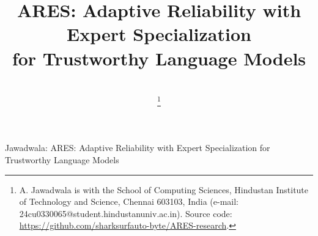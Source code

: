 \documentclass[journal,10pt,twocolumn]{IEEEtran}
\begin{document}
\title{ARES: Adaptive Reliability with Expert Specialization\\for Trustworthy Language Models}

\author{
     \\
    \thanks{A. Jawadwala is with the School of Computing Sciences, Hindustan Institute of Technology and Science, Chennai 603103, India (e-mail: 24cu0330065@student.hindustanuniv.ac.in). Source code: \url{https://github.com/sharksurfauto-byte/ARES-research}.}
}

%
{Jawadwala: ARES: Adaptive Reliability with Expert Specialization for Trustworthy Language Models}

\maketitle
\end{document}
